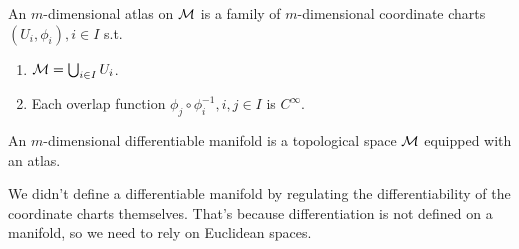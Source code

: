 \documentclass[../main.tex]{subfiles}
\begin{document}
    \begin{definition}[Atlas]\label{def:atlas}
        An \(m\)-dimensional atlas on \(\manifold[M]\) is a family of 
        \(m\)-dimensional coordinate charts \((U_i, \phi_i), i \in I\) s.t. 
        \begin{enumerate}
            \item \(\manifold[M] = \bigcup_{i \in I}^{} U_i\).
            \item Each overlap function \(\phi_j \circ \phi_i ^{-1}, i, j \in I\) 
            is \(C ^{\infty}\).
        \end{enumerate}
    \end{definition}
    \begin{definition}\label{def:differentiable-manifolds}
        An \(m\)-dimensional differentiable manifold is a topological space 
        \(\manifold[M]\) equipped with an atlas.
    \end{definition}
    \begin{remark}
        We didn't define a differentiable manifold by regulating the 
        differentiability of the coordinate charts themselves. That's because 
        differentiation is not defined on a manifold, so we need to rely on 
        Euclidean spaces.
    \end{remark}
\end{document}
